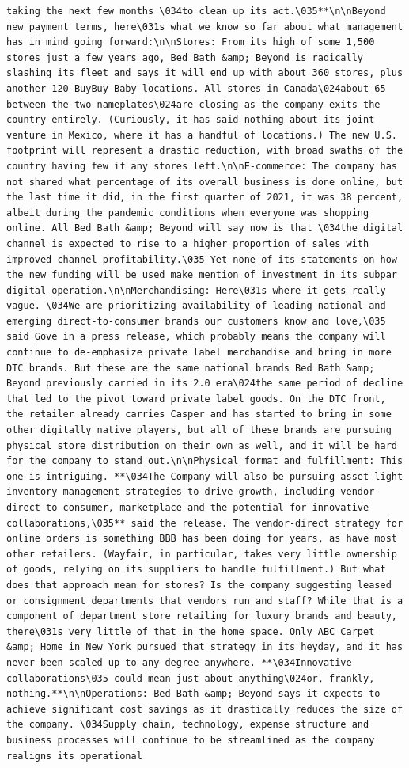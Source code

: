 \documentclass[
  letterpaper,
  DIV=11,
  numbers=noendperiod]{scrreprt}
\begin{document}
\begin{verbatim}
taking the next few months \034to clean up its act.\035**\n\nBeyond new payment terms, here\031s what we know so far about what management has in mind going forward:\n\nStores: From its high of some 1,500 stores just a few years ago, Bed Bath &amp; Beyond is radically slashing its fleet and says it will end up with about 360 stores, plus another 120 BuyBuy Baby locations. All stores in Canada\024about 65 between the two nameplates\024are closing as the company exits the country entirely. (Curiously, it has said nothing about its joint venture in Mexico, where it has a handful of locations.) The new U.S. footprint will represent a drastic reduction, with broad swaths of the country having few if any stores left.\n\nE-commerce: The company has not shared what percentage of its overall business is done online, but the last time it did, in the first quarter of 2021, it was 38 percent, albeit during the pandemic conditions when everyone was shopping online. All Bed Bath &amp; Beyond will say now is that \034the digital channel is expected to rise to a higher proportion of sales with improved channel profitability.\035 Yet none of its statements on how the new funding will be used make mention of investment in its subpar digital operation.\n\nMerchandising: Here\031s where it gets really vague. \034We are prioritizing availability of leading national and emerging direct-to-consumer brands our customers know and love,\035 said Gove in a press release, which probably means the company will continue to de-emphasize private label merchandise and bring in more DTC brands. But these are the same national brands Bed Bath &amp; Beyond previously carried in its 2.0 era\024the same period of decline that led to the pivot toward private label goods. On the DTC front, the retailer already carries Casper and has started to bring in some other digitally native players, but all of these brands are pursuing physical store distribution on their own as well, and it will be hard for the company to stand out.\n\nPhysical format and fulfillment: This one is intriguing. **\034The Company will also be pursuing asset-light inventory management strategies to drive growth, including vendor-direct-to-consumer, marketplace and the potential for innovative collaborations,\035** said the release. The vendor-direct strategy for online orders is something BBB has been doing for years, as have most other retailers. (Wayfair, in particular, takes very little ownership of goods, relying on its suppliers to handle fulfillment.) But what does that approach mean for stores? Is the company suggesting leased or consignment departments that vendors run and staff? While that is a component of department store retailing for luxury brands and beauty, there\031s very little of that in the home space. Only ABC Carpet &amp; Home in New York pursued that strategy in its heyday, and it has never been scaled up to any degree anywhere. **\034Innovative collaborations\035 could mean just about anything\024or, frankly, nothing.**\n\nOperations: Bed Bath &amp; Beyond says it expects to achieve significant cost savings as it drastically reduces the size of the company. \034Supply chain, technology, expense structure and business processes will continue to be streamlined as the company realigns its operational 
\end{verbatim}
\end{document}
